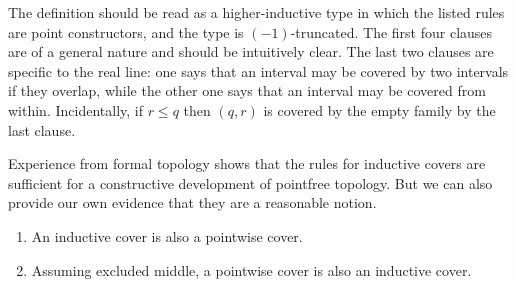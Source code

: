 The definition should be read as a higher-inductive type in which the listed rules are
point constructors, and the type is $(-1)$-truncated. The first four clauses are of a
general nature and should be intuitively clear. The last two clauses are specific to the
real line: one says that an interval may be covered by two intervals if they overlap,
while the other one says that an interval may be covered from within. Incidentally, if $r
\leq q$ then $(q, r)$ is covered by the empty family by the last clause.

Experience from formal topology shows that the rules for inductive covers are sufficient
for a constructive development of pointfree topology. But we can also provide our own
evidence that they are a reasonable notion.

\begin{thm} \label{inductive-cover-classical}
  \mbox{}
  \begin{enumerate}
  \item An inductive cover is also a pointwise cover.
  \item Assuming excluded middle, a pointwise cover is also an inductive cover.
  \end{enumerate}
\end{thm}


